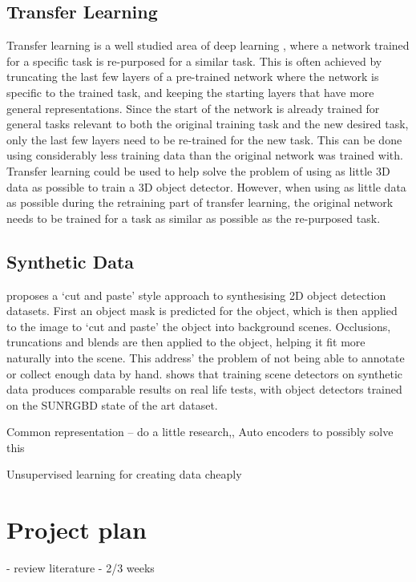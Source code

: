 \documentclass[11pt]{article}
\begin{document}
\subsection*{Transfer Learning}
Transfer learning is a well studied area of deep learning \cite{DeCAF}\cite{survery_on_transfer}\cite{how_transferable}, where a network trained for a specific task is re-purposed for a similar task. This is often achieved by truncating the last few layers of a pre-trained network where the network is specific to the trained task, and keeping the starting layers that have more general representations. Since the start of the network is already trained for general tasks relevant to both the original training task and the new desired task, only the last few layers need to be re-trained for the new task. This can be done using considerably less training data than the original network was trained with. Transfer learning could be used to help solve the problem of using as little 3D data as possible to train a 3D object detector. However, when using as little data as possible during the retraining part of transfer learning, the original network needs to be trained for a task as similar as possible as the re-purposed task.

\subsection*{Synthetic Data}
\cite{cut_paste} proposes a `cut and paste' style approach to synthesising 2D object detection datasets. First an object mask is predicted for the object, which is then applied to the image to `cut and paste' the object into background scenes. Occlusions, truncations and blends are then applied to the object, helping it fit more naturally into the scene. This address' the problem of not being able to annotate or collect enough data by hand. \cite{synthetic_train} shows that training scene detectors on synthetic data produces comparable results on real life tests, with object detectors trained on the SUNRGBD state of the art dataset.

Common representation -- do a little research,,
	Auto encoders to possibly solve this 

Unsupervised learning for creating data cheaply


\section{Project plan}

- review literature  -  2/3 weeks
\end{document}
